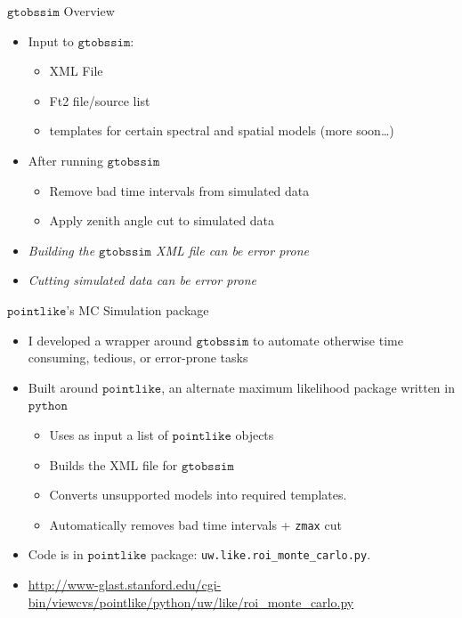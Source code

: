 \documentclass[12pt]{beamer}
\newcommand{\python}{\ensuremath{\mathtt{python}}\xspace}
\newcommand{\pointlike}{\ensuremath{\mathtt{pointlike}}\xspace}
\newcommand{\gtobssim}{\ensuremath{\mathtt{gtobssim}}\xspace}
\begin{document}
\begin{frame}{\gtobssim Overview}
  \begin{itemize}
    \item Input to \gtobssim:
      \begin{itemize}
        \item XML File
        \item Ft2 file/source list
        \item templates for certain spectral and spatial models (more soon\dots)
      \end{itemize}
    \item After running \gtobssim
      \begin{itemize}
        \item Remove bad time intervals from simulated data
        \item Apply zenith angle cut to simulated data
      \end{itemize}
    \item \em{Building the \gtobssim XML file can be error prone}
    \item \em{Cutting simulated data can be error prone}
  \end{itemize}
\end{frame}

\begin{frame}{\pointlike's MC Simulation package}
  \begin{itemize}
    \item I developed a wrapper around \gtobssim to automate
      otherwise time consuming, tedious, or error-prone tasks
    \item Built around \pointlike, an alternate maximum
      likelihood package written in \python
      \begin{itemize}
      \item Uses as input a list of \pointlike objects
        \item Builds the XML file for \gtobssim
        \item Converts unsupported models into required templates.
        \item Automatically removes bad time intervals + \texttt{zmax} cut
      \end{itemize}
    \item Code is in \pointlike package: \texttt{uw.like.roi\_monte\_carlo.py}.
    \item \url{http://www-glast.stanford.edu/cgi-bin/viewcvs/pointlike/python/uw/like/roi_monte_carlo.py}
  \end{itemize}
\end{frame}
\end{document}
